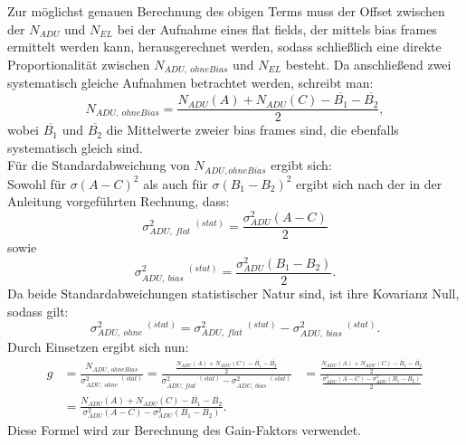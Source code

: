 Zur möglichst genauen Berechnung des obigen Terms muss der Offset zwischen der $N_{ADU}$ und $N_{EL}$ bei der Aufnahme eines flat fields, der mittels bias frames ermittelt werden kann, herausgerechnet werden, sodass schließlich eine direkte Proportionalität zwischen $N_{ADU,\ ohneBias}$ und $N_{EL}$ besteht. 
Da anschließend zwei systematisch gleiche Aufnahmen betrachtet werden, schreibt man: 
\begin{equation}
N_{ADU,\ ohneBias} = \frac{N_{ADU}(A) + N_{ADU}(C) - \overline{B_1} - \overline{B_2}}{2}, 
\end{equation}
wobei $\overline{B_1}$ und $\overline{B_2}$ die Mittelwerte zweier bias frames sind, die ebenfalls systematisch gleich sind. \\
Für die Standardabweichung von $N_{ADU, ohneBias}$ ergibt sich: \\
Sowohl für $\sigma(A-C)^2$ als auch für $\sigma(B_1 - B_2)^2$ ergibt sich nach der in der Anleitung vorgeführten Rechnung, dass:
\begin{equation}
\sigma_{ADU,\ flat}^2 \ ^{(stat)} = \frac{\sigma_{ADU}^2(A-C)}{2}
\end{equation}
sowie
\begin{equation}
\sigma_{ADU,\ bias}^2 \ ^{(stat)} = \frac{\sigma_{ADU}^2(B_1-B_2)}{2}.
\end{equation}
Da beide Standardabweichungen statistischer Natur sind, ist ihre Kovarianz Null, sodass gilt: 
\begin{equation}
\sigma_{ADU, \ ohne}^2  \ ^{(stat)}=  \sigma_{ADU,\ flat}^2 \ ^{(stat)} - \sigma_{ADU,\ bias}^2 \ ^{(stat)}.
\end{equation}
Durch Einsetzen ergibt sich nun: 
\begin{align}
g &= \frac{N_{ADU,\ ohneBias}}{\sigma_{ADU, \ ohne}^2  \ ^{(stat)}} = \frac{\frac{N_{ADU}(A) + N_{ADU}(C) - \overline{B_1} - \overline{B_2}}{2}}{\sigma_{ADU,\ flat}^2 \ ^{(stat)} - \sigma_{ADU,\ bias}^2 \ ^{(stat)}} &=\frac{\frac{N_{ADU}(A) + N_{ADU}(C) - \overline{B_1} - \overline{B_2}}{2}}{\frac{\sigma_{ADU}^2(A-C) - \sigma_{ADU}^2(B_1-B_2)}{2}} \nonumber\\
&= \frac{N_{ADU}(A) + N_{ADU}(C) - \overline{B_1} - \overline{B_2}}{\sigma_{ADU}^2(A-C) - \sigma_{ADU}^2(B_1-B_2)}.\
\label{form:gain}
\end{align}
Diese Formel wird zur Berechnung des Gain-Faktors verwendet. 

